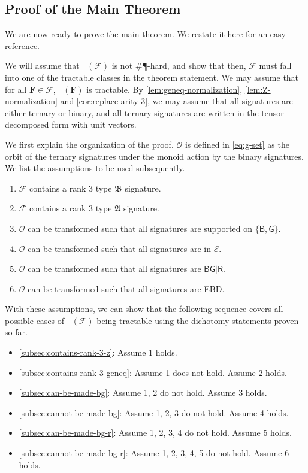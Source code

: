 \documentclass[11pt]{article}
\DeclareMathOperator{\holts}{Holant^*_3}
\newcommand{\db}{\mathsf{B}}
\newcommand{\dg}{\mathsf{G}}
\newcommand{\dr}{\mathsf{R}}
\newcommand{\sph}{\#\P-hard\xspace}
\newcommand{\strspt}{\textsf{EBD}\xspace}
\newcommand{\ternarytractgeneq}{$\mathfrak{A}$\xspace}
\newcommand{\ternarytractz}{$\mathfrak{B}$\xspace}
\begin{document}
\subsection{Proof of the Main Theorem}
We are now ready to prove the main theorem.
We restate it here for an easy reference.
\maintheorem*

We will assume that $\holts(\mathcal{F})$ is not \sph, and show that then, $\mathcal{F}$ must fall into one of the tractable classes in the theorem statement.
We may assume that for all $\mathbf{F} \in \mathcal{F}$, $\holts(\mathbf{F})$ is tractable.
By \cref{lem:geneq-normalization}, \cref{lem:Z-normalization} and \cref{cor:replace-arity-3}, we may assume that all signatures are either ternary or binary, 
and all ternary signatures are written in the tensor decomposed form with unit vectors.


We first explain the organization of the proof.
$\mathcal{O}$ is defined in \cref{eq:g-set} as the orbit of the ternary signatures under the monoid action by the binary signatures.
We list the assumptions to be used subsequently.
\begin{enumerate}
    \item $\mathcal{F}$ contains a rank $3$ type \ternarytractz signature.
    \item $\mathcal{F}$ contains a rank $3$ type \ternarytractgeneq signature.
    \item $\mathcal{O}$ can be transformed such that all signatures are supported on $\{\db, \dg\}$.
    \item
    $\mathcal{O}$ can be transformed such that all signatures are in $\mathcal{E}$.
    \item 
    $\mathcal{O}$ can be transformed such that all signatures are $\db \dg | \dr$.
    \item $\mathcal{O}$ can be transformed such that all signatures are \strspt.
\end{enumerate}
With these assumptions, we can show that the following sequence covers all possible cases of $\holts(\mathcal{F})$ being tractable using the dichotomy statements proven so far.
\begin{itemize}
    \item \cref{subsec:contains-rank-3-z}: Assume 1 holds.
    \item \cref{subsec:contains-rank-3-geneq}: Assume 1 does not hold. Assume 2 holds.
    \item \cref{subsec:can-be-made-bg}: Assume 1, 2 do not hold. Assume 3 holds.
    \item \cref{subsec:cannot-be-made-bg}: Assume 1, 2, 3 do not hold. Assume 4 holds.
    \item \cref{subsec:can-be-made-bg-r}: Assume 1, 2, 3, 4 do not hold. Assume 5 holds.
    \item \cref{subsec:cannot-be-made-bg-r}: Assume 1, 2, 3, 4, 5 do not hold. Assume 6 holds.
\end{itemize}
\end{document}
